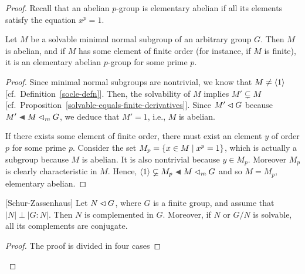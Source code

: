 \begin{solution}
\begin{proof}
\medskip
Recall that an abelian $p$-group is elementary abelian if all its elements satisfy the equation $x^p=1$.

\begin{lem}\label{solvable-minimal-normal}
    Let\/ $M$ be a solvable minimal normal subgroup of an arbitrary group\/ $G$. Then\/ $M$ is abelian, and if\/ $M$ has some element of finite order (for instance, if $M$ is finite), it is an elementary abelian\/ $p$-group for some prime\/ $p$.
\end{lem}

\begin{proof} Since minimal normal subgroups are nontrivial, we know that $M\ne\langle1\rangle$  [cf.~Definition~\ref{socle-defn}]. Then, the solvability of $M$ implies $M'\varsubsetneq M$ [cf.~Proposition~\ref{solvable-equals-finite-derivatives}]. Since $M'\lhd G$ because $M'\ch M\normal_m G$, we deduce that $M'=1$, i.e., $M$ is abelian.

If there exists some element of finite order, there must exist an element $y$ of order $p$ for some prime $p$. Consider the set $M_p=\{x\in M\mid x^p=1\}$, which is actually a subgroup because $M$ is abelian. It is also nontrivial because $y\in M_p$. Moreover $M_p$ is clearly characteristic in $M$. Hence, $\gen1\varsubsetneq M_p\ch M\normal_m G$ and so $M=M_p$, elementary abelian.  \end{proof}


\begin{thm}\label{schur-zassenhaus-thm}{\rm [Schur-Zassenhaus]}
    Let\/ $N\lhd G$, where\/ $G$ is a finite group, and assume that\/ $|N|\perp|G:N|$. Then\/ $N$ is complemented in\/ $G$. Moreover, if\/ $N$ or $G/N$ is solvable, all its complements are conjugate.
\end{thm}

\begin{proof} The proof is divided in four cases


\end{proof}
\end{proof}
\end{solution}
